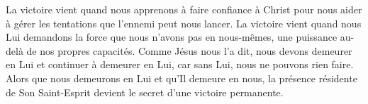 La victoire vient quand nous apprenons à faire confiance à Christ
 pour nous aider à gérer les tentations que l'ennemi peut nous lancer.
 La victoire vient quand nous Lui demandons la force
 que nous n'avons pas en nous-mêmes, une puissance au-delà
 de nos propres capacités.
 Comme Jésus nous l'a dit, nous devons demeurer en Lui
 et continuer à demeurer en Lui, car sans Lui, nous ne pouvons rien faire.
 Alors que nous demeurons en Lui et qu'Il demeure en nous,
 la présence résidente de Son Saint-Esprit
 devient le secret d'une victoire permanente.

\dvrule





